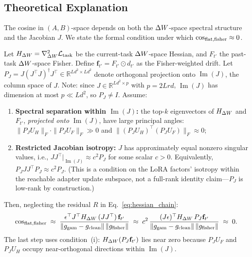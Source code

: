 \subsection{Theoretical Explanation}
\label{sec:theory}

The cosine in $(A,B)$-space depends on both the $\Delta W$-space spectral structure
and the Jacobian $J$.
We state the formal condition under which $\cos_{\mathrm{flat,fisher}}\approx 0$.

\begin{proposition}
\label{prop:orthogonality}
Let $H_{\Delta W} = \nabla^2_{\Delta W}\mathcal{L}_{\mathrm{task}}$ be the current-task $\Delta W$-space Hessian,
and $F_{t'}$ the past-task $\Delta W$-space Fisher.
Define $\mathbf{f}_{t'} = F_{t'}\odot d_{t'}$ as the Fisher-weighted drift.
Let $P_J = J(J^\top J)^\dagger J^\top \in \mathbb{R}^{Ld^2\times Ld^2}$ denote orthogonal
projection onto $\operatorname{Im}(J)$, the column space of $J$.
Note: since $J\in\mathbb{R}^{Ld^2\times p}$ with $p=2Lrd$, $\operatorname{Im}(J)$ has
dimension at most $p \ll Ld^2$, so $P_J \neq I$.
Assume:
\begin{enumerate}[label=(\roman*)]
  \item \textbf{Spectral separation within $\operatorname{Im}(J)$:} the top-$k$ eigenvectors of
    $H_{\Delta W}$ and $F_{t'}$, \emph{projected onto} $\operatorname{Im}(J)$, have large principal angles:
    $\|P_J U_H\|_F \cdot \|P_J U_F\|_F \gg 0$
    and $\|(P_J U_H)^\top (P_J U_F)\|_F \approx 0$;
  \item \textbf{Restricted Jacobian isotropy:} $J$ has approximately equal nonzero singular
    values, i.e., $JJ^\top\big|_{\operatorname{Im}(J)} \approx c^2 P_J$ for some scalar $c>0$.
    Equivalently, $P_J JJ^\top P_J \approx c^2 P_J$.
    (This is a condition on the LoRA factors' isotropy within the reachable adapter update subspace,
    not a full-rank identity claim---$P_J$ is low-rank by construction.)
\end{enumerate}
Then, neglecting the residual $R$ in Eq.~\eqref{eq:hessian_chain}:
\begin{equation}
  \cos_{\mathrm{flat,fisher}} \;\approx\;
  \frac{\epsilon^\top J^\top H_{\Delta W}\,(JJ^\top)\,\mathbf{f}_{t'}}
    {\|g_{\mathrm{gam}}-g_{\mathrm{clean}}\|\,\|g_{\mathrm{fisher}}\|}
  \;\approx\;
  c^2\,\frac{(J\epsilon)^\top H_{\Delta W}\,P_J\mathbf{f}_{t'}}
    {\|g_{\mathrm{gam}}-g_{\mathrm{clean}}\|\,\|g_{\mathrm{fisher}}\|}
  \;\approx\; 0.
\end{equation}
The last step uses condition~(i): $H_{\Delta W}(P_J\mathbf{f}_{t'})$ lies near zero
because $P_J U_F$ and $P_J U_H$ occupy near-orthogonal directions within $\operatorname{Im}(J)$.
\end{proposition}

